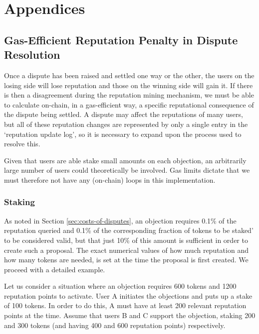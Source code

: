 \section{Appendices}

\subsection{Gas-Efficient Reputation Penalty in Dispute Resolution} \label{appendix:rep-transfer}

Once a dispute has been raised and settled one way or the other, the users on the losing side will lose reputation and those on the winning side will gain it. If there is then a disagreement during the reputation mining mechanism, we must be able to calculate on-chain, in a gas-efficient way, a specific reputational consequence of the dispute being settled. A dispute may affect the reputations of many users, but all of these reputation changes are represented by only a single entry in the `reputation update log', so it is necessary to expand upon the process used to resolve this.

Given that users are able stake small amounts on each objection, an arbitrarily large number of users could theoretically be involved. Gas limits dictate that we must therefore not have any (on-chain) loops in this implementation.

\subsubsection{Staking}

As noted in Section \ref{sec:costs-of-disputes}, an objection requires 0.1\% of the reputation queried and 0.1\% of the corresponding fraction of tokens to be staked' to be considered valid, but that just 10\% of this amount is sufficient in order to create such a proposal. The exact numerical values of how much reputation and how many tokens are needed, is set at the time the proposal is first created. We proceed with a detailed example.

Let us consider a situation where an objection requires 600 tokens and 1200 reputation points to activate. User A initiates the objections and puts up a stake of 100 tokens. In order to do this, A must have at least 200 relevant reputation points at the time. Assume that users B and C support the objection, staking 200 and 300 tokens (and having 400 and 600 reputation points) respectively.

